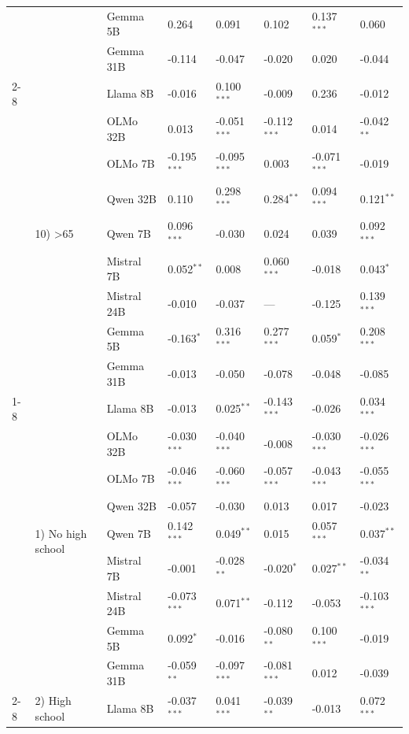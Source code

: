 \begin{longtable}[t]{llllllll}
 &  & Gemma 5B & 0.264 & 0.091 & 0.102 & 0.137$^{***}$ & 0.060 \\
 &  & Gemma 31B & -0.114 & -0.047 & -0.020 & 0.020 & -0.044 \\
\cline{2-8}
 & \multirow[t]{9}{*}{10) >65} & Llama 8B & -0.016 & 0.100$^{***}$ & -0.009 & 0.236 & -0.012 \\
 &  & OLMo 32B & 0.013 & -0.051$^{***}$ & -0.112$^{***}$ & 0.014 & -0.042$^{**}$ \\
 &  & OLMo 7B & -0.195$^{***}$ & -0.095$^{***}$ & 0.003 & -0.071$^{***}$ & -0.019 \\
 &  & Qwen 32B & 0.110 & 0.298$^{***}$ & 0.284$^{**}$ & 0.094$^{***}$ & 0.121$^{**}$ \\
 &  & Qwen 7B & 0.096$^{***}$ & -0.030 & 0.024 & 0.039 & 0.092$^{***}$ \\
 &  & Mistral 7B & 0.052$^{**}$ & 0.008 & 0.060$^{***}$ & -0.018 & 0.043$^{*}$ \\
 &  & Mistral 24B & -0.010 & -0.037 & --- & -0.125 & 0.139$^{***}$ \\
 &  & Gemma 5B & -0.163$^{*}$ & 0.316$^{***}$ & 0.277$^{***}$ & 0.059$^{*}$ & 0.208$^{***}$ \\
 &  & Gemma 31B & -0.013 & -0.050 & -0.078 & -0.048 & -0.085 \\
\cline{1-8} \cline{2-8}
\multirow[t]{45}{*}{Education} & \multirow[t]{9}{*}{1) No high school} & Llama 8B & -0.013 & 0.025$^{**}$ & -0.143$^{***}$ & -0.026 & 0.034$^{***}$ \\
 &  & OLMo 32B & -0.030$^{***}$ & -0.040$^{***}$ & -0.008 & -0.030$^{***}$ & -0.026$^{***}$ \\
 &  & OLMo 7B & -0.046$^{***}$ & -0.060$^{***}$ & -0.057$^{***}$ & -0.043$^{***}$ & -0.055$^{***}$ \\
 &  & Qwen 32B & -0.057 & -0.030 & 0.013 & 0.017 & -0.023 \\
 &  & Qwen 7B & 0.142$^{***}$ & 0.049$^{**}$ & 0.015 & 0.057$^{***}$ & 0.037$^{**}$ \\
 &  & Mistral 7B & -0.001 & -0.028$^{**}$ & -0.020$^{*}$ & 0.027$^{**}$ & -0.034$^{**}$ \\
 &  & Mistral 24B & -0.073$^{***}$ & 0.071$^{**}$ & -0.112 & -0.053 & -0.103$^{***}$ \\
 &  & Gemma 5B & 0.092$^{*}$ & -0.016 & -0.080$^{**}$ & 0.100$^{***}$ & -0.019 \\
 &  & Gemma 31B & -0.059$^{**}$ & -0.097$^{***}$ & -0.081$^{***}$ & 0.012 & -0.039 \\
\cline{2-8}
 & \multirow[t]{9}{*}{2) High school} & Llama 8B & -0.037$^{***}$ & 0.041$^{***}$ & -0.039$^{**}$ & -0.013 & 0.072$^{***}$ \\

\end{longtable}
